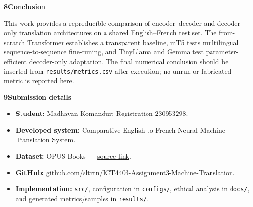 \documentclass[10pt]{article}
\newcommand{\sectiontitle}[1]{\par\vspace{5pt}\textbf{\large #1}\vspace{2pt}\par}
\begin{document}
\sectiontitle{8\quad Conclusion}
This work provides a reproducible comparison of encoder--decoder and decoder-only translation
architectures on a shared English--French test set. The from-scratch Transformer establishes a
transparent baseline, mT5 tests multilingual sequence-to-sequence fine-tuning, and TinyLlama
and Gemma test parameter-efficient decoder-only adaptation. The final numerical conclusion
should be inserted from \texttt{results/metrics.csv} after execution; no unrun or fabricated
metric is reported here.

\sectiontitle{9\quad Submission details}
\begin{itemize}
\item \textbf{Student:} Madhavan Komandur; Registration 230953298.
\item \textbf{Developed system:} Comparative English-to-French Neural Machine Translation System.
\item \textbf{Dataset:} OPUS Books --- \href{https://opus.nlpl.eu/legacy/opus-books.php}{source link}.
\item \textbf{GitHub:} \href{https://github.com/sltrtn/ICT4403-Assignment3-Machine-Translation}{github.com/sltrtn/ICT4403-Assignment3-Machine-Translation}.
\item \textbf{Implementation:} \texttt{src/}, configuration in \texttt{configs/}, ethical analysis
in \texttt{docs/}, and generated metrics/samples in \texttt{results/}.
\end{itemize}
\end{document}
